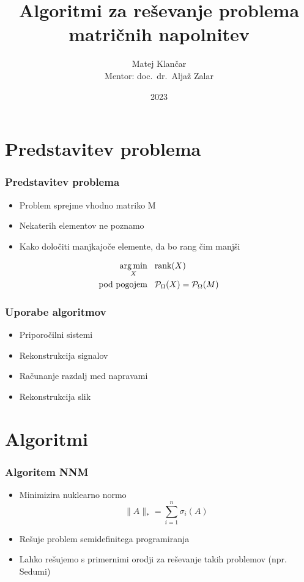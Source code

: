 \documentclass{beamer}
\title{Algoritmi za reševanje problema matričnih napolnitev}
\author[Matej Klančar]{Matej Klančar \\ \vspace{0.2cm} Mentor: doc.\ dr.\ Aljaž Zalar}
\date{2023}
\newcommand{\nnorm}[1]{\lVert#1\rVert_*}
\newcommand{\proj}{\mathcal{P}_\Omega}
\DeclareMathOperator*{\argmin}{arg\,min}
\begin{document}
\frame{\titlepage}
\section{Predstavitev problema}
\begin{frame}
  \frametitle{Predstavitev problema}
  \begin{itemize}
    \item Problem sprejme vhodno matriko M 
    \item Nekaterih elementov \alert{ne poznamo}
    \item Kako določiti manjkajoče elemente, da bo \alert{rang čim manjši}
  \end{itemize}
  \begin{align*}
  \argmin_{X} \hspace{0.3cm} &\text{rank}(X) \\
  \text{pod pogojem} \hspace{0.3cm} &\proj(X) = \proj(M)
  \end{align*}
\end{frame}

\begin{frame}
  \frametitle{Uporabe algoritmov}
  \begin{itemize}
    \item Priporočilni sistemi
    \item Rekonstrukcija signalov
    \item Računanje razdalj med napravami
    \item Rekonstrukcija slik
  \end{itemize}
\end{frame}

\section{Algoritmi}
\begin{frame}
  \frametitle{Algoritem NNM}
  \begin{itemize}
    \item Minimizira \alert{nuklearno normo} \[
            \nnorm{A} = \sum_{i = 1}^{n} \sigma_i(A)
          \]
    \item Rešuje problem semidefinitega programiranja
    \item Lahko rešujemo s primernimi orodji za reševanje takih problemov (npr. Sedumi)
  \end{itemize}
\end{frame}
\end{document}
